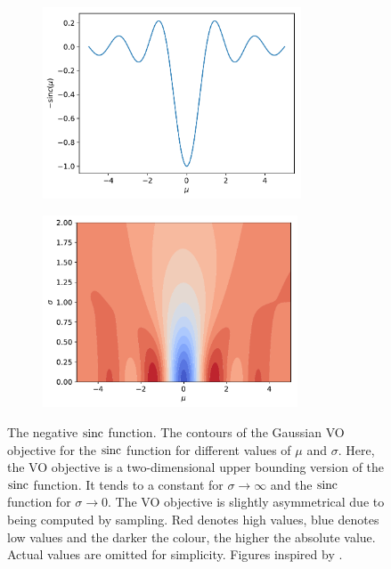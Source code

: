 \begin{figure}[tbp!]
    \begin{subfigure}[b]{0.49\textwidth}
        \centering
        \includegraphics[height=5.7cm]{graphics/var-opt-intu/variational-optimization-function-sinc.pdf}
        \caption{}
        \label{fig: Theory: var-opt-intu-sinc-function}
    \end{subfigure}
    \hfill
    \begin{subfigure}[b]{0.49\textwidth}
        \centering
        \includegraphics[height=5.7cm]{graphics/var-opt-intu/variational-optimization-contour-sinc.pdf}
        \caption{}
        \label{fig: Theory: var-opt-intu-sinc-contour}
    \end{subfigure}
    \caption{ The negative ${\text{sinc}}$ function.  The contours of the Gaussian \gls{VO} objective for the ${\text{sinc}}$ function for different values of $\mu$ and $\sigma$. Here, the \gls{VO} objective is a two-dimensional upper bounding version of the ${\text{sinc}}$ function. It tends to a constant for $\sigma\rightarrow\infty$ and the ${\text{sinc}}$ function for $\sigma\rightarrow0$. The \gls{VO} objective is slightly asymmetrical due to being computed by sampling. Red denotes high values, blue denotes low values and the darker the colour, the higher the absolute value. Actual values are omitted for simplicity. Figures inspired by \cite{Huszar2017}.}
    \label{fig: Theory: var-opt-intu-sinc}
\end{figure}
